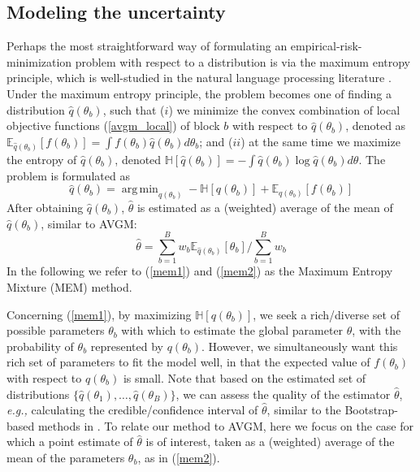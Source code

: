 \documentclass{article}
\DeclareMathOperator*{\argmin}{arg\,min}
\newcommand{\eg}[0]{\emph{e.g., }}
\newcommand{\1}[0]{\ensuremath{\boldsymbol{1}}\xspace}
\begin{document}
\subsection{Modeling the uncertainty}\label{MEM}

Perhaps the most straightforward way of formulating an empirical-risk-minimization problem with respect to a distribution is via the maximum entropy principle, which is well-studied in the natural language processing literature \cite{Berger1996}. Under the maximum entropy principle, the problem becomes one of finding a distribution $\hat q(\theta_b)$, such that ($i$) we minimize the convex combination of local objective functions (\ref{avgm_local}) of block $b$ with respect to $\hat q(\theta_b)$, denoted as $\mathbb{E}_{\hat q(\theta_b)}[f(\theta_b)] = \int f(\theta_b)\hat q(\theta_b) d\theta_b$; and ($ii$) at the same time we maximize the entropy of $\hat q(\theta_b)$, denoted $\mathbb{H}[\hat q(\theta_b)] = -\int \hat q(\theta_b)\log  \hat q(\theta_b) d\theta$. The problem is formulated as
\begin{equation}\label{mem1}
\textstyle\hat q(\theta_b) =\argmin_{q(\theta_b)} -\mathbb{H}[q(\theta_b)] +  \mathbb{E}_{q(\theta_b) }[f(\theta_b)]
\end{equation}
After obtaining $\hat q(\theta_b)$, $\hat\theta$ is estimated as a (weighted) average of the mean of $\hat q(\theta_b)$, similar to AVGM: 
\begin{equation}\label{mem2}
\hat\theta = \textstyle\sum_{b=1}^Bw_b\mathbb{E}_{\hat q(\theta_b) }[\theta_b]/\sum_{b=1}^Bw_b
\end{equation}
In the following we refer to (\ref{mem1}) and (\ref{mem2}) as the Maximum Entropy Mixture (MEM) method. 

Concerning (\ref{mem1}), by maximizing $\mathbb{H}[q(\theta_b)]$, we seek a rich/diverse set of possible parameters $\theta_b$ with which to estimate the global parameter $\theta$, with the probability of $\theta_b$ represented by $q(\theta_b)$. However, we simultaneously want this rich set of parameters to fit the model well, in that the expected value of $f(\theta_b)$ with respect to $q(\theta_b)$ is small. Note that based on the estimated set of distributions $\{\hat q(\theta_1), \ldots, \hat q(\theta_B)\}$, we can assess the quality of the estimator $\hat\theta$, \eg calculating the credible/confidence interval of $\hat\theta$, similar to the Bootstrap-based methods in \cite{Kleiner2012}. To relate our method to AVGM, here we focus on the case for which a point estimate of $\hat\theta$ is of interest, taken as a (weighted) average of the mean of the parameters $\theta_b$, as in (\ref{mem2}).
\end{document}
